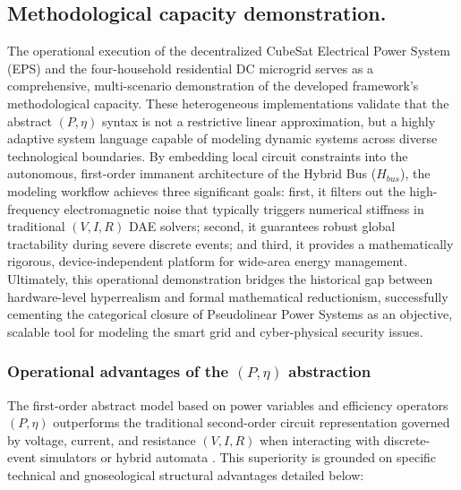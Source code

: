 \documentclass[energies,accept,oneauthor,pdftex]{Definitions/mdpi}
\begin{document}
\subsection{Methodological capacity demonstration.}
 \label{sec:methodological_capacity}

The operational execution of the decentralized CubeSat Electrical Power System (EPS) and the four-household residential DC microgrid serves as a comprehensive, multi-scenario demonstration of the developed framework's methodological capacity. These heterogeneous implementations validate that the abstract
$(P,\eta)$ syntax is not a restrictive linear approximation, but a highly adaptive system language capable of modeling dynamic systems across diverse technological boundaries. By embedding local circuit constraints into the autonomous, first-order immanent architecture of the Hybrid Bus
($H_{bus}$), the modeling workflow achieves three significant goals: first, it filters out the high-frequency electromagnetic noise that typically triggers numerical stiffness in traditional $(V,I,R)$ DAE solvers; second, it guarantees robust global tractability during severe discrete events; and third, it provides a mathematically rigorous, device-independent platform for wide-area energy management. Ultimately, this operational demonstration bridges the historical gap between hardware-level hyperrealism and formal mathematical reductionism, successfully cementing the categorical closure of Pseudolinear Power Systems as an objective, scalable tool for modeling the smart grid and cyber-physical security issues.


\subsubsection{Operational advantages of the $(P, \eta)$ abstraction}
The first-order abstract model based on power variables and efficiency operators $(P, \eta)$ outperforms the traditional second-order circuit representation governed by voltage, current, and resistance $(V, I, R)$ when interacting with discrete-event simulators or hybrid automata \cite{gonzalezdedurana2025novel, en19020304}. This superiority is grounded on specific technical and gnoseological structural advantages detailed below:
\end{document}
